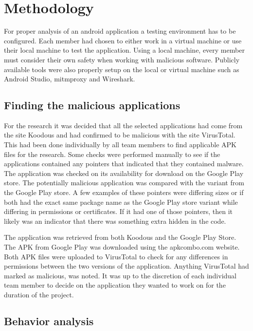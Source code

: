 \section{Methodology}

For proper analysis of an android application a testing environment has to be configured.
Each member had chosen to either work in a virtual machine or use their local machine to test the application.
Using a local machine, every member must consider their own safety when working with malicious software.
Publicly available tools were also properly setup on the local or virtual machine such as Android Studio, mitmproxy and Wireshark.

\subsection{Finding the malicious applications}

For the research it was decided that all the selected applications had come from the site Koodous and had confirmed to be malicious with the site VirusTotal.
This had been done individually by all team members to find applicable APK files for the research.
Some checks were performed manually to see if the applications contained any pointers that indicated that they contained malware.
The application was checked on its availability for download on the Google Play store.
The potentially malicious application was compared with the variant from the Google Play store.
A few examples of these pointers were differing sizes or if both had the exact same package name as the Google Play store variant while differing in permissions or certificates.
If it had one of those pointers, then it likely was an indicator that there was something extra hidden in the code.

The application was retrieved from both Koodous and the Google Play Store.
The APK from Google Play was downloaded using the apkcombo.com website.
Both APK files were uploaded to VirusTotal to check for any differences in permissions between the two versions of the application.
Anything VirusTotal had marked as malicious, was noted.
It was up to the discretion of each individual team member to decide on the application they wanted to work on for the duration of the project.

\subsection{Behavior analysis}

